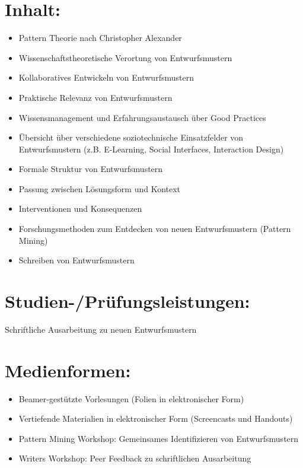 \section*{Inhalt:}\label{inhalt-12}

\begin{itemize}
\tightlist
\item
  Pattern Theorie nach Christopher Alexander
\item
  Wissenschaftstheoretische Verortung von Entwurfsmustern
\item
  Kollaboratives Entwickeln von Entwurfsmustern
\item
  Praktische Relevanz von Entwurfsmustern
\item
  Wissensmanagement und Erfahrungsaustausch über Good Practices
\item
  Übersicht über verschiedene soziotechnische Einsatzfelder von
  Entwurfsmustern (z.B. E-Learning, Social Interfaces, Interaction
  Design)
\item
  Formale Struktur von Entwurfsmustern
\item
  Passung zwischen Lösungsform und Kontext
\item
  Interventionen und Konsequenzen
\item
  Forschungsmethoden zum Entdecken von neuen Entwurfsmustern (Pattern
  Mining)
\item
  Schreiben von Entwurfsmustern
\end{itemize}

\section*{Studien-/Prüfungsleistungen:}\label{studien-pruxfcfungsleistungen-12}

Schriftliche Ausarbeitung zu neuen Entwurfsmustern

\section*{Medienformen:}\label{medienformen-12}

\begin{itemize}
\tightlist
\item
  Beamer-gestützte Vorlesungen (Folien in elektronischer Form)
\item
  Vertiefende Materialien in elektronischer Form (Screencasts und
  Handouts)
\item
  Pattern Mining Workshop: Gemeinsames Identifizieren von
  Entwurfsmustern
\item
  Writers Workshop: Peer Feedback zu schriftlichen Ausarbeitung
\end{itemize}


